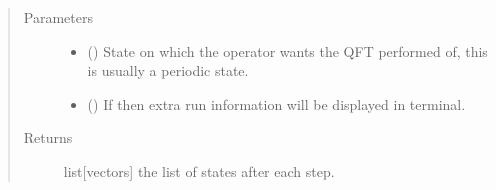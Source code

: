 \documentclass[letterpaper,10pt,english]{sphinxmanual}
\begin{document}
\begin{fulllineitems}
\begin{description}
\end{description}
\begin{quote}\begin{description}
\item[{Parameters}] \leavevmode\begin{itemize}
\item {} 
 (\sphinxstyleliteralemphasis{\sphinxupquote{{[}}}\sphinxstyleliteralemphasis{\sphinxupquote{{]}}}) \textendash{} State on which the operator wants the QFT performed 
of, this is usually a periodic state.

\item {} 
 () \textendash{} If  then extra run information will be 
displayed in terminal.

\end{itemize}

\item[{Returns}] \leavevmode
list{[}vectors{]} \textendash{} the list of states after each step.

\end{description}\end{quote}

\end{fulllineitems}

\end{document}
